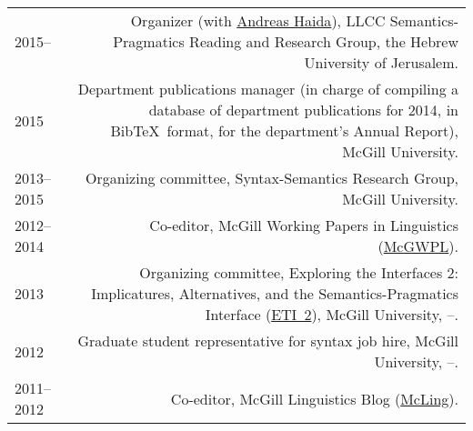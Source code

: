 \documentclass[11pt,letterpaper,twoside]{article}
\makeatletter
\newcommand{\formatdatenoday}[2]{\mydatenoday\formatdate{0}{#1}{#2}}
\newcommand{\myvrule}{\color{lightgray}\vrule width 1.0pt}
\newenvironment{cvsection}{%
  \renewcommand{\arraystretch}{1.75}
  \begin{longtable}[l]{@{} L R @{}}
}{%
  \end{longtable}
}
\makeatother
\begin{document}
\begin{cvsection}
  2015-- & Organizer (with
  \href{http://amor.cms.hu-berlin.de/~haidaand/}{Andreas Haida}), LLCC
  Semantics-Pragmatics Reading and Research Group, the Hebrew University of
  Jerusalem. \\

  2015 & Department publications manager (in charge of compiling a database of
  department publications for 2014, in Bib\TeX\ format, for the department's
  Annual Report), McGill University. \\

  2013--2015 & Organizing committee, Syntax-Semantics Research Group, McGill
  University. \\

  2012--2014 & Co-editor, McGill Working Papers in Linguistics
  (\href{http://www.mcgill.ca/mcgwpl/}{McGWPL}). \\

  2013 & Organizing committee, Exploring the Interfaces 2: Implicatures,
  Alternatives, and the Semantics-Pragmatics Interface
  (\href{https://sites.google.com/site/eti2pragmatics/}{ETI~2}), McGill
  University, \shortmonthname[4]--\formatdatenoday{6}{2013}. \\




  2012 & Graduate student representative for syntax job hire, McGill
  University, \shortmonthname[5]--\formatdatenoday{6}{2012}. \\




  2011--2012 & Co-editor, McGill Linguistics Blog
  (\href{https://blogs.mcgill.ca/mcling/}{McLing}). \\
\end{cvsection}
\end{document}
